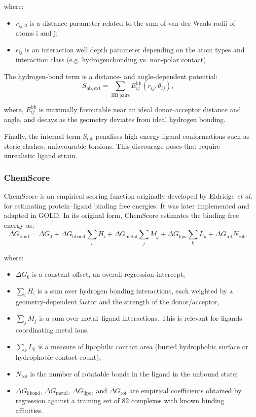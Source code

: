 \documentclass[12pt, a4paper]{article}
\begin{document}
where:
\begin{itemize}
    \item $r_{ij,0}$ is a distance parameter related to the sum of van der Waals radii of atoms i and j;
    \item $\epsilon_{ij}$ is an interaction well depth parameter depending on the atom types and interaction class (e.g. hydrogencbonding vs. non-polar contact).
\end{itemize}

The hydrogen-bond term is a distance- and angle-dependent potential:
\begin{equation}
S_{\mathrm{hb,ext}}
=
\sum_{\mathrm{HB\ pairs}}
E^{\mathrm{hb}}_{ij}(r_{ij}, \theta_{ij}),
\end{equation}

where,
$E^{\mathrm{hb}}_{ij}$ is maximally favourable near an ideal donor–acceptor distance and angle, and decays as the geometry deviates from ideal hydrogen bonding.

Finally, the internal term $S_{\mathrm{int}}$ penalises high energy ligand conformations such as steric clashes, unfavourable torsions. This discourage poses that require unrealistic ligand strain.

\subsubsection{ChemScore}
ChemScore is an empirical scoring function originally developed by Eldridge \textit{et al.} for estimating protein–ligand binding free energies.\cite{CH7_Eldridge1997} It was later implemented and adapted in GOLD.\cite{CH7_Verdonk2003} In its original form, ChemScore estimates the binding free energy as:
\begin{equation}
\Delta G_{\mathrm{bind}}
=
\Delta G_{0}
+
\Delta G_{\mathrm{hbond}}
\sum_{i} H_{i}
+
\Delta G_{\mathrm{metal}}
\sum_{j} M_{j}
+
\Delta G_{\mathrm{lipo}}
\sum_{k} L_{k}
+
\Delta G_{\mathrm{rot}} N_{\mathrm{rot}},
\label{eq:ChemScore}
\end{equation}

where:
\begin{itemize}
    \item $\Delta G_{0}$ is a constant offset, an overall regression intercept,
    \item $\sum_{i} H_{i}$ is a sum over hydrogen bonding interactions, each weighted by a geometry-dependent factor and the strength of the donor/acceptor,
    \item $\sum_{j} M_{j}$ is a sum over metal–ligand interactions. This is relevant for ligands coordinating metal ions,
    \item $\sum_{k} L_{k}$ is a measure of lipophilic contact area (buried hydrophobic surface or hydrophobic contact count);
    \item $N_{\mathrm{rot}}$ is the number of rotatable bonds in the ligand in the unbound state;
    \item $\Delta G_{\mathrm{hbond}}$, $\Delta G_{\mathrm{metal}}$, $\Delta G_{\mathrm{lipo}}$, and $\Delta G_{\mathrm{rot}}$ are empirical coefficients obtained by regression against a training set of 82 complexes with known binding affinities.\cite{CH7_Eldridge1997}
\end{itemize}
\end{document}
